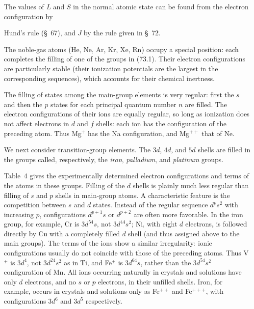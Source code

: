 The values of $L$ and $S$ in the normal atomic state can be found from the electron configuration by

Hund's rule (\S~67), and $J$ by the rule given in \S~72.

The noble-gas atoms (He, Ne, Ar, Kr, Xe, Rn) occupy a special position: each completes the filling of one of the groups in (73.1). Their electron configurations are particularly stable (their ionization potentials are the largest in the corresponding sequences), which accounts for their chemical inertness.

The filling of states among the main-group elements is very regular: first the $s$ and then the $p$ states for each principal quantum number $n$ are filled. The electron configurations of their ions are equally regular, so long as ionization does not affect electrons in $d$ and $f$ shells: each ion has the configuration of the preceding atom. Thus Mg$^+$ has the Na configuration, and Mg$^{++}$ that of Ne.

We next consider transition-group elements. The $3d$, $4d$, and $5d$ shells are filled in the groups called, respectively, the \emph{iron}, \emph{palladium}, and \emph{platinum} groups.

Table~4 gives the experimentally determined electron configurations and terms of the atoms in these groups. Filling of the $d$ shells is plainly much less regular than filling of $s$ and $p$ shells in main-group atoms. A characteristic feature is the competition between $s$ and $d$ states. Instead of the regular sequence $d^ps^2$ with increasing $p$, configurations $d^{p+1}s$ or $d^{p+2}$ are often more favorable. In the iron group, for example, Cr is $3d^54s$, not $3d^44s^2$; Ni, with eight $d$ electrons, is followed directly by Cu with a completely filled $d$ shell (and thus assigned above to the main groups). The terms of the ions show a similar irregularity: ionic configurations usually do not coincide with those of the preceding atoms. Thus V$^+$ is $3d^4$, not $3d^24s^2$ as in Ti, and Fe$^+$ is $3d^64s$, rather than the $3d^54s^2$ configuration of Mn. All ions occurring naturally in crystals and solutions have only $d$ electrons, and no $s$ or $p$ electrons, in their unfilled shells. Iron, for example, occurs in crystals and solutions only as Fe$^{++}$ and Fe$^{+++}$, with configurations $3d^6$ and $3d^5$ respectively.

